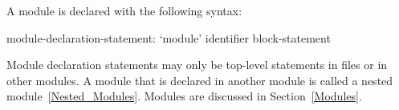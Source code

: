 A module is declared with the following syntax:
\begin{syntax}
module-declaration-statement:
  `module' identifier block-statement
\end{syntax}

Module declaration statements may only be top-level statements in
files or in other modules.  A module that is declared in another
module is called a nested module~\ref{Nested_Modules}.  Modules are
discussed in Section~\ref{Modules}.
